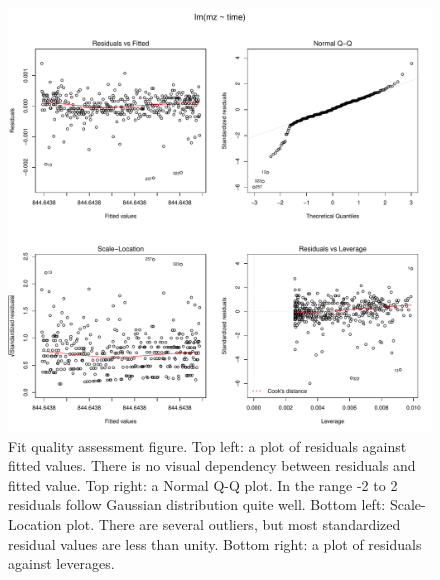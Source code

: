 \documentclass[]{article}
\newenvironment{Shaded}{\begin{snugshade}}{\end{snugshade}}
\newcommand{\KeywordTok}[1]{\textcolor[rgb]{0.13,0.29,0.53}{\textbf{#1}}}
\newcommand{\DataTypeTok}[1]{\textcolor[rgb]{0.13,0.29,0.53}{#1}}
\newcommand{\DecValTok}[1]{\textcolor[rgb]{0.00,0.00,0.81}{#1}}
\newcommand{\StringTok}[1]{\textcolor[rgb]{0.31,0.60,0.02}{#1}}
\newcommand{\ControlFlowTok}[1]{\textcolor[rgb]{0.13,0.29,0.53}{\textbf{#1}}}
\newcommand{\OperatorTok}[1]{\textcolor[rgb]{0.81,0.36,0.00}{\textbf{#1}}}
\newcommand{\NormalTok}[1]{#1}
\begin{document}
\begin{Shaded}
\end{Shaded}

\begin{figure}[H]
\begin{center}
\includegraphics{Supplementary_document_files/figure-latex/fit.lin-1.pdf}
\caption{Fit quality assessment figure. 
Top left: a plot of residuals against fitted values. There is no visual dependency between residuals and fitted value.
Top right: a Normal Q-Q plot. In the range -2 to 2 residuals follow Gaussian distribution quite well.
 Bottom left: Scale-Location plot. There are several outliers, but most standardized residual values are less than unity.
 Bottom right: a plot of residuals against leverages.}
\label{fig:lin.fit.844}
\end{center}
\end{figure}
\end{document}
